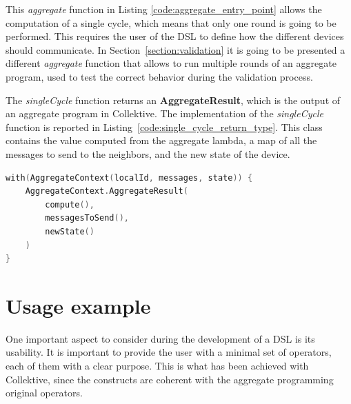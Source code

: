This \textit{aggregate} function in Listing \ref{code:aggregate_entry_point} allows the computation of a single cycle, which means that only one round is going to be performed. This requires the user of the DSL to define how the different devices should communicate.\newline
In Section~\ref{section:validation} it is going to be presented a different \textit{aggregate} function that allows to run multiple rounds of an aggregate program, used to test the correct behavior during the validation process.

The \textit{singleCycle} function returns an \textbf{AggregateResult}, which is the output of an aggregate program in Collektive. The implementation of the \textit{singleCycle} function is reported in Listing~\ref{code:single_cycle_return_type}. This class contains the value computed from the aggregate lambda, a map of all the messages to send to the neighbors, and the new state of the device.
\begin{lstlisting}[caption={Single cycle \textit{AggregateResult} output}, captionpos=b, language=Kotlin, label={code:single_cycle_return_type}]
with(AggregateContext(localId, messages, state)) {
    AggregateContext.AggregateResult(
        compute(),
        messagesToSend(),
        newState()
    )
}
\end{lstlisting}

\section{Usage example}\label{section:usage_example}
One important aspect to consider during the development of a DSL is its usability. It is important to provide the user with a minimal set of operators, each of them with a clear purpose.\newline
This is what has been achieved with Collektive, since the constructs are coherent with the aggregate programming original operators.

